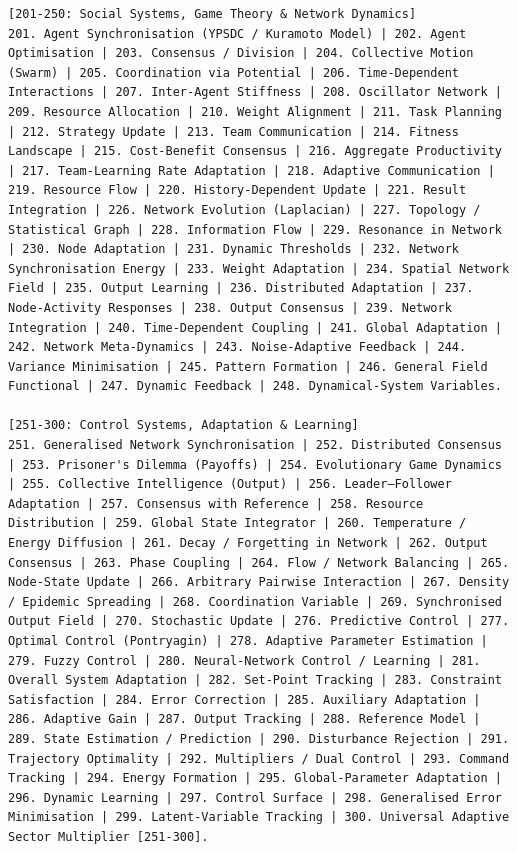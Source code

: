 \documentclass[11pt,a4paper]{article}
\begin{document}
\begin{tcolorbox}
\begin{lstlisting}[basicstyle=\scriptsize\ttfamily, breaklines=true, columns=fullflexible]
[201-250: Social Systems, Game Theory & Network Dynamics]
201. Agent Synchronisation (YPSDC / Kuramoto Model) | 202. Agent Optimisation | 203. Consensus / Division | 204. Collective Motion (Swarm) | 205. Coordination via Potential | 206. Time-Dependent Interactions | 207. Inter-Agent Stiffness | 208. Oscillator Network | 209. Resource Allocation | 210. Weight Alignment | 211. Task Planning | 212. Strategy Update | 213. Team Communication | 214. Fitness Landscape | 215. Cost-Benefit Consensus | 216. Aggregate Productivity | 217. Team-Learning Rate Adaptation | 218. Adaptive Communication | 219. Resource Flow | 220. History-Dependent Update | 221. Result Integration | 226. Network Evolution (Laplacian) | 227. Topology / Statistical Graph | 228. Information Flow | 229. Resonance in Network | 230. Node Adaptation | 231. Dynamic Thresholds | 232. Network Synchronisation Energy | 233. Weight Adaptation | 234. Spatial Network Field | 235. Output Learning | 236. Distributed Adaptation | 237. Node-Activity Responses | 238. Output Consensus | 239. Network Integration | 240. Time-Dependent Coupling | 241. Global Adaptation | 242. Network Meta-Dynamics | 243. Noise-Adaptive Feedback | 244. Variance Minimisation | 245. Pattern Formation | 246. General Field Functional | 247. Dynamic Feedback | 248. Dynamical-System Variables.

[251-300: Control Systems, Adaptation & Learning]
251. Generalised Network Synchronisation | 252. Distributed Consensus | 253. Prisoner's Dilemma (Payoffs) | 254. Evolutionary Game Dynamics | 255. Collective Intelligence (Output) | 256. Leader–Follower Adaptation | 257. Consensus with Reference | 258. Resource Distribution | 259. Global State Integrator | 260. Temperature / Energy Diffusion | 261. Decay / Forgetting in Network | 262. Output Consensus | 263. Phase Coupling | 264. Flow / Network Balancing | 265. Node-State Update | 266. Arbitrary Pairwise Interaction | 267. Density / Epidemic Spreading | 268. Coordination Variable | 269. Synchronised Output Field | 270. Stochastic Update | 276. Predictive Control | 277. Optimal Control (Pontryagin) | 278. Adaptive Parameter Estimation | 279. Fuzzy Control | 280. Neural-Network Control / Learning | 281. Overall System Adaptation | 282. Set-Point Tracking | 283. Constraint Satisfaction | 284. Error Correction | 285. Auxiliary Adaptation | 286. Adaptive Gain | 287. Output Tracking | 288. Reference Model | 289. State Estimation / Prediction | 290. Disturbance Rejection | 291. Trajectory Optimality | 292. Multipliers / Dual Control | 293. Command Tracking | 294. Energy Formation | 295. Global-Parameter Adaptation | 296. Dynamic Learning | 297. Control Surface | 298. Generalised Error Minimisation | 299. Latent-Variable Tracking | 300. Universal Adaptive Sector Multiplier [251-300].


\end{lstlisting}
\end{tcolorbox}
\end{document}
